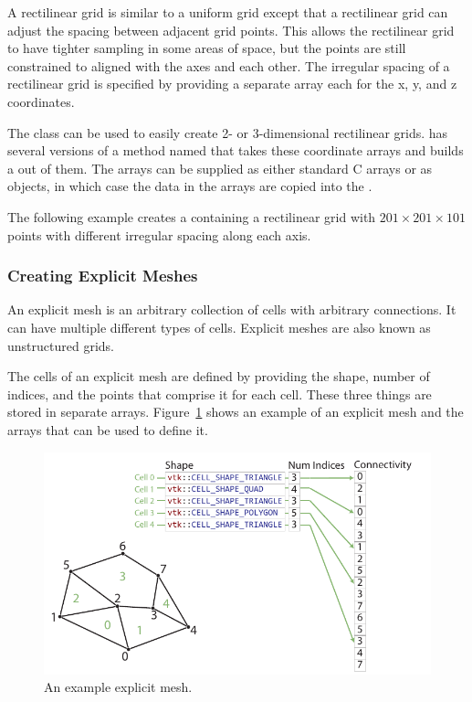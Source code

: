 
A rectilinear grid is similar to a uniform grid except that a rectilinear
grid can adjust the spacing between adjacent grid points. This allows the
rectilinear grid to have tighter sampling in some areas of space, but the
points are still constrained to aligned with the axes and each other. The
irregular spacing of a rectilinear grid is specified by providing a
separate array each for the x, y, and z coordinates.

The  class can be used to easily create
2- or 3-dimensional rectilinear grids.
 has several versions of a method
named  that takes these coordinate arrays and builds a
 out of them. The arrays can be supplied as either
standard C arrays or as  objects, in which case the
data in the arrays are copied into the .

The following example creates a  containing a rectilinear
grid with $201 \times 201 \times 101$ points with different irregular
spacing along each axis.


\subsubsection{Creating Explicit Meshes}


An explicit mesh is an arbitrary collection of cells with arbitrary
connections. It can have multiple different types of cells. Explicit meshes
are also known as unstructured grids.

The cells of an explicit mesh are defined by providing the shape, number of
indices, and the points that comprise it for each cell. These three things
are stored in separate arrays. Figure~\ref{fig:ExplicitMesh} shows an
example of an explicit mesh and the arrays that can be used to define it.

\begin{figure}
  \centering
  \includegraphics{images/ExplicitCellConnections}
  \caption{An example explicit mesh.}
  \label{fig:ExplicitMesh}
\end{figure}

